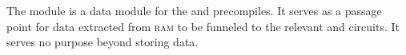 The \blkMdxMod{} module is a data module for the \instModexp{} and \instBlake{} precompiles.
It serves as a passage point for data extracted from \textsc{ram} to be funneled to the relevant \instModexp{} and \instBlake{} circuits.
It serves no purpose beyond storing data.
